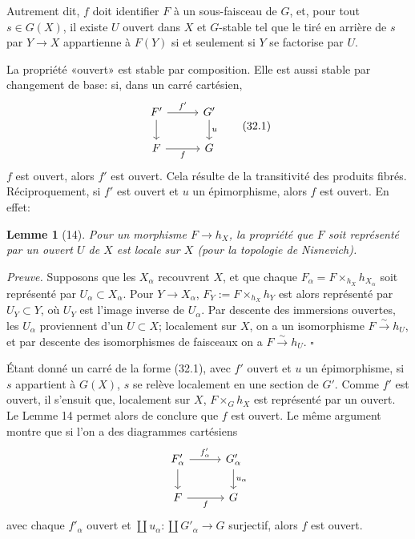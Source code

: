 \documentclass[11pt]{article}
\theoremstyle{deligne}
\newtheorem*{lemma*}{Lemme}
\newenvironment{proofdel}{\noindent\textit{Preuve.}}{\hfill$\square$}
\begin{document}
Autrement dit, \(f\) doit identifier \(F\) à un sous-faisceau de \(G\), et, pour tout \(s\in G(X)\), il existe \(U\) ouvert dans \(X\) et \(G\)-stable tel que le tiré en arrière de \(s\) par \(Y\to X\) appartienne à \(F(Y)\) si et seulement si \(Y\) se factorise par \(U\).

La propriété «ouvert» est stable par composition. Elle est aussi stable par changement de base: si, dans un carré cartésien,
\[
\begin{tikzcd}[column sep=2.8em,row sep=1.8em]
F' \arrow[r,"f'"] \arrow[d] & G' \arrow[d,"u"] \\
F \arrow[r,"f"'] & G
\end{tikzcd}
\tag{32.1}
\]
\(f\) est ouvert, alors \(f'\) est ouvert. Cela résulte de la transitivité des produits fibrés. Réciproquement, si \(f'\) est ouvert et \(u\) un épimorphisme, alors \(f\) est ouvert. En effet:

\begin{lemma*}[14]
Pour un morphisme \(F\to h_X\), la propriété que \(F\) soit représenté par un ouvert \(U\) de \(X\) est locale sur \(X\) (pour la topologie de Nisnevich).
\end{lemma*}

\begin{proofdel}
Supposons que les \(X_\alpha\) recouvrent \(X\), et que chaque \(F_\alpha=F\times_{h_X}h_{X_\alpha}\) soit représenté par \(U_\alpha\subset X_\alpha\). Pour \(Y\to X_\alpha\), \(F_Y:=F\times_{h_X}h_Y\) est alors représenté par \(U_Y\subset Y\), où \(U_Y\) est l'image inverse de \(U_\alpha\). Par descente des immersions ouvertes, les \(U_\alpha\) proviennent d'un \(U\subset X\); localement sur \(X\), on a un isomorphisme \(F\xrightarrow{\sim}h_U\), et par descente des isomorphismes de faisceaux on a \(F\xrightarrow{\sim}h_U\).
\end{proofdel}

Étant donné un carré de la forme (32.1), avec \(f'\) ouvert et \(u\) un épimorphisme, si \(s\) appartient à \(G(X)\), \(s\) se relève localement en une section de \(G'\). Comme \(f'\) est ouvert, il s'ensuit que, localement sur \(X\), \(F\times_G h_X\) est représenté par un ouvert. Le Lemme 14 permet alors de conclure que \(f\) est ouvert. Le même argument montre que si l'on a des diagrammes cartésiens
\[
\begin{tikzcd}[column sep=2.8em,row sep=1.8em]
F'_\alpha \arrow[r,"f'_\alpha"] \arrow[d] & G'_\alpha \arrow[d,"u_\alpha"] \\
F \arrow[r,"f"'] & G
\end{tikzcd}
\]
avec chaque \(f'_\alpha\) ouvert et \(\coprod u_\alpha:\coprod G'_\alpha\to G\) surjectif, alors \(f\) est ouvert.
\end{document}
